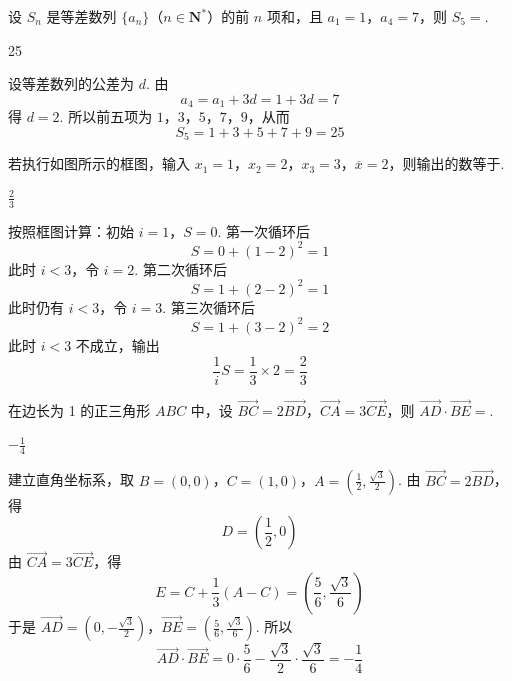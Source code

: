 \begin{problem}
设 \(S_{n}\) 是等差数列 \(\{a_{n}\}\)（\(n \in \mathbf{N}^{*}\)）的前 \(n\) 项和，且 \(a_{1} = 1\)，\(a_{4} = 7\)，则 \(S_{5} =\)\fillinblank{}.
\end{problem}

\begin{answer}
25
\end{answer}

\begin{solution}
设等差数列的公差为 \(d\). 由
\[
a_4=a_1+3d=1+3d=7
\]
得 \(d=2\). 所以前五项为 \(1\)，\(3\)，\(5\)，\(7\)，\(9\)，从而
\[
S_5=1+3+5+7+9=25
\]
\end{solution}

\begin{problem}
若执行如图所示的框图，输入 \(x_{1} = 1\)，\(x_{2} = 2\)，\(x_{3} = 3\)，\(\overline{x} = 2\)，则输出的数等于\fillinblank{}.

\end{problem}

\begin{answer}
\(\frac{2}{3}\)
\end{answer}

\begin{solution}
按照框图计算：初始 \(i=1\)，\(S=0\). 第一次循环后
\[
S=0+(1-2)^2=1
\]
此时 \(i<3\)，令 \(i=2\). 第二次循环后
\[
S=1+(2-2)^2=1
\]
此时仍有 \(i<3\)，令 \(i=3\). 第三次循环后
\[
S=1+(3-2)^2=2
\]
此时 \(i<3\) 不成立，输出
\[
\frac{1}{i}S=\frac{1}{3}\times2=\frac{2}{3}
\]
\end{solution}

\begin{problem}
在边长为 1 的正三角形 \(ABC\) 中，设 \(\overrightarrow{BC} = 2\overrightarrow{BD}\)，\(\overrightarrow{CA} = 3\overrightarrow{CE}\)，则 \(\overrightarrow{AD} \cdot \overrightarrow{BE} =\)\fillinblank{}.
\end{problem}

\begin{answer}
\(-\frac{1}{4}\)
\end{answer}

\begin{solution}
建立直角坐标系，取 \(B=(0,0)\)，\(C=(1,0)\)，\(A=\left(\frac12,\frac{\sqrt3}{2}\right)\). 由 \(\overrightarrow{BC}=2\overrightarrow{BD}\)，得
\[
D=\left(\frac12,0\right)
\]
由 \(\overrightarrow{CA}=3\overrightarrow{CE}\)，得
\[
E=C+\frac13(A-C)=\left(\frac56,\frac{\sqrt3}{6}\right)
\]
于是
\(\overrightarrow{AD}=\left(0,-\frac{\sqrt3}{2}\right)\)，\(\overrightarrow{BE}=\left(\frac56,\frac{\sqrt3}{6}\right)\).
所以
\[
\overrightarrow{AD}\cdot\overrightarrow{BE}=0\cdot\frac56-\frac{\sqrt3}{2}\cdot\frac{\sqrt3}{6}=-\frac14
\]
\end{solution}

